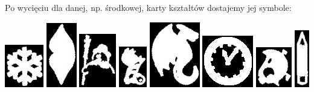 \documentclass[10pt,a4paper]{article}
\begin{document}
Po wycięciu dla danej, np. środkowej, karty kształtów dostajemy jej symbole:
\begin{center}
\includegraphics[scale=0.5]{2.2/sign00.jpg}
\includegraphics[scale=0.5]{2.2/sign01.jpg}
\includegraphics[scale=0.5]{2.2/sign02.jpg}
\includegraphics[scale=0.5]{2.2/sign03.jpg}
\includegraphics[scale=0.5]{2.2/sign04.jpg}
\includegraphics[scale=0.5]{2.2/sign05.jpg}
\includegraphics[scale=0.5]{2.2/sign06.jpg}
\includegraphics[scale=0.5]{2.2/sign07.jpg}
\end{center}
\end{document}

